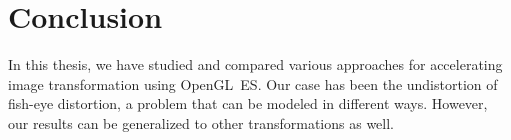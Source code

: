 \documentclass[english,12pt]{ifimaster}
\begin{document}











\chapter{Conclusion}
\label{chap:conclusion}


In this thesis, we have studied and compared various approaches for
accelerating image transformation using OpenGL~ES. Our case has been
the undistortion of fish-eye distortion, a problem that can be modeled
in different ways. However, our results can be generalized to other
transformations as well.
\end{document}
